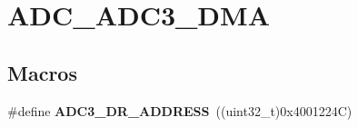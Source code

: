 \hypertarget{group___a_d_c___a_d_c3___d_m_a}{\section{A\-D\-C\-\_\-\-A\-D\-C3\-\_\-\-D\-M\-A}
\label{group___a_d_c___a_d_c3___d_m_a}
}
\subsection*{Macros}
\begin{DoxyCompactItemize}
\item 
\hypertarget{group___a_d_c___a_d_c3___d_m_a_gaad1e5ee6482000eb316dae56f93fe691}{\#define {\bfseries A\-D\-C3\-\_\-\-D\-R\-\_\-\-A\-D\-D\-R\-E\-S\-S}~((uint32\-\_\-t)0x4001224\-C)}\label{group___a_d_c___a_d_c3___d_m_a_gaad1e5ee6482000eb316dae56f93fe691}

\end{DoxyCompactItemize}
